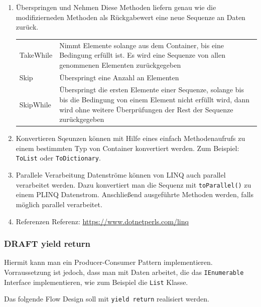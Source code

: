 \documentclass[11pt]{article}
\begin{document}
\begin{enumerate}
\begin{center}
\begin{tabular}{ll}
\end{tabular}
\end{center}
\item Überspringen und Nehmen
\label{sec:orgheadline46}
Diese Methoden liefern genau wie die modifizierneden Methoden als Rückgabewert
eine neue Sequenze an Daten zurück.
\begin{center}
\begin{tabular}{ll}
TakeWhile & Nimmt Elemente solange aus dem Container, bis eine Bedingung erfüllt ist. Es wird eine Sequenze von allen genommenen Elementen zurückgegeben\\
Skip & Überspringt eine Anzahl an Elementen\\
SkipWhile & Überspringt die ersten Elemente einer Sequenze, solange bis bis die Bedingung von einem Element nicht erfüllt wird, dann wird ohne weitere Überprüfungen der Rest der Sequenze zurückgegeben\\
\end{tabular}
\end{center}
\item Konvertieren
\label{sec:orgheadline47}
Sqeunzen können mit Hilfe eines einfach Methodenaufrufs zu einem bestimmten Typ
von Container konvertiert werden. Zum Beispiel: \texttt{ToList} oder \texttt{ToDictionary}.

\item Parallele Verarbeitung
\label{sec:orgheadline48}
Datenströme können von LINQ auch parallel verarbeitet werden. Dazu konvertiert
man die Sequenz mit \texttt{toParallel()} zu einem PLINQ Datenstrom.
Anschließend ausgeführte Methoden werden, falls möglich parallel verarbeitet. 

\item Referenzen
\label{sec:orgheadline49}
Referenz: \url{https://www.dotnetperls.com/linq}
\end{enumerate}

\subsubsection{{\bfseries\sffamily DRAFT} yield return}
\label{sec:orgheadline53}
Hiermit kann man ein Producer-Consumer Pattern implementieren.
Vorraussetzung ist jedoch, dass man mit Daten arbeitet, die das \texttt{IEnumerable} Interface implementieren, wie zum Beispiel die
\texttt{List} Klasse.

Das folgende Flow Design soll mit \texttt{yield return} realisiert werden.
\end{document}
